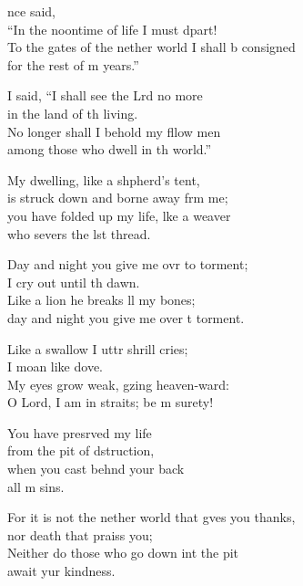 \begin{psalmverse}
  \begin{patverse}
    nce  said,\Med\\
“In the noontime of life I must dpart!\\
To the gates of the nether world I shall b consigned\Med\\
for the rest of m years.”

I said, “I shall see the Lrd no more\Med\\
in the land of th living.\\
No longer shall I behold my fllow men\Med\\
among those who dwell in th world.”

My dwelling, like a shpherd’s tent,\Med\\
is struck down and borne away frm me;\\
you have folded up my life, l\pointup{\i}ke a weaver\Med\\
who severs the lst thread.

Day and night you give me ovr to torment;\Med\\
I cry out until th dawn.\\
Like a lion he breaks ll my bones;\Med\\
day and night you give me over t torment.

Like a swallow I uttr shrill cries;\Med\\
I moan like  dove.\\
My eyes grow weak, gzing heaven-ward:\Med\\
O Lord, I am in straits; be m surety!

You have presrved my life\Med\\
from the pit of dstruction,\\
when you cast beh\pointup{\i}nd your back\Med\\
all m sins.

For it is not the nether world that g\pointup{\i}ves you thanks,\Med\\
nor death that praiss you;\\
Neither do those who go down int the pit\Med\\
await yur kindness.


\end{patverse}
\end{psalmverse}
